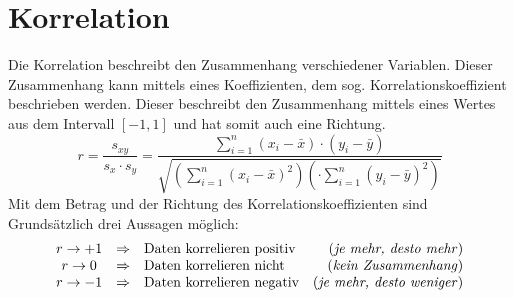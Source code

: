 \section{Korrelation}
Die \gls{Korrelation} beschreibt den Zusammenhang verschiedener Variablen.
Dieser Zusammenhang kann mittels eines Koeffizienten, dem sog. 
\gls{Korrelationskoeffizient} beschrieben werden. Dieser beschreibt den
Zusammenhang mittels eines Wertes aus dem Intervall $[-1,1]$ und
hat somit auch eine Richtung.
\[	
	r 
	= \frac{s_{xy}}{s_x \cdot s_y}
	= \frac{\sum\limits_{i=1}^n (x_i-\bar{x}) \cdot (y_i-\bar{y})}{
		\sqrt{\left(\sum\limits_{i=1}^n (x_i-\bar{x})^2\right)
		\left(\cdot \sum\limits_{i=1}^n (y_i-\bar{y})^2\right) }}
\]
Mit dem Betrag und der Richtung des Korrelationskoeffizienten sind 
Grundsätzlich drei Aussagen möglich:
\[ \begin{array}{c c l r}	
	r \rightarrow +1 
		& \Rightarrow 
		& \text{Daten korrelieren positiv} 
		& \text{(\emph{je mehr, desto mehr})} \\
	r \rightarrow 0 
		& \Rightarrow 
		& \text{Daten korrelieren nicht}
		& \text{(\emph{kein Zusammenhang})} \\
	r \rightarrow -1 
		& \Rightarrow 
		& \text{Daten korrelieren negativ}
		& \text{(\emph{je mehr, desto weniger})}
\end{array} \]
